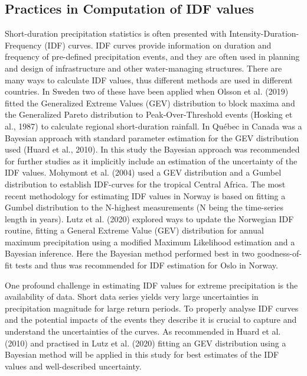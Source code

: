  

\subsection{Practices in Computation of IDF values}

Short-duration precipitation statistics is often presented with Intensity-Duration-Frequency (IDF) curves. IDF curves provide information on duration and frequency of pre-defined precipitation events, and they are often used in planning and design of infrastructure and other water-managing structures. There are many ways to calculate IDF values, thus different methods are used in different countries. In Sweden two of these have been applied when Olsson et al. (2019) fitted the Generalized Extreme Values (GEV) distribution to block maxima and the Generalized Pareto distribution to Peak-Over-Threshold events (Hosking et al., 1987) to calculate regional short-duration rainfall. In Québec in Canada was a Bayesian approach with standard parameter estimation for the GEV distribution used (Huard et al., 2010). In this study the Bayesian approach was recommended for further studies as it implicitly include an estimation of the uncertainty of the IDF values. Mohymont et al. (2004) used a GEV distribution and a Gumbel distribution to establish IDF-curves for the tropical Central Africa. The most recent methodology for estimating IDF values in Norway is based on fitting a Gumbel distribution to the N-highest measurements (N being the time-series length in years). Lutz et al. (2020) explored ways to update the Norwegian IDF routine, fitting a General Extreme Value (GEV) distribution for annual maximum precipitation using a modified Maximum Likelihood estimation and a Bayesian inference. Here the Bayesian method performed best in two goodness-of-fit tests and thus was recommended for IDF estimation for Oslo in Norway.

One profound challenge in estimating IDF values for extreme precipitation is the availability of data. Short data series yields very large uncertainties in precipitation magnitude for large return periods. To properly analyse IDF curves and the potential impacts of the events they describe it is crucial to capture and understand the uncertainties of the curves. As recommended in Huard et al. (2010) and practised in Lutz et al. (2020) fitting an GEV distribution using a Bayesian method will be applied in this study for best estimates of the IDF values and well-described uncertainty.  
 

